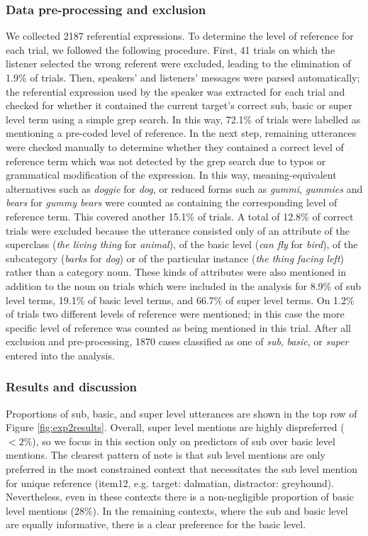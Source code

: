\documentclass[11pt]{article}
\newcommand{\figref}[1]{Figure \ref{#1}}
\begin{document}
\subsubsection{Data pre-processing and exclusion}

We collected 2187 referential expressions. To determine the level of reference for each trial, we followed the following procedure. First, 41 trials on which the listener selected the wrong referent were excluded, leading to the elimination of 1.9\% of trials. Then, speakers' and listeners' messages were parsed automatically; the referential expression used by the speaker was extracted for each trial and checked for whether it contained the current target's correct sub, basic or super level term using a simple grep search. In this way, 72.1\% of trials were labelled as mentioning a pre-coded level of reference. In the next step, remaining utterances were checked manually to determine whether they contained a correct level of reference term which was not detected by the grep search due to typos or grammatical modification of the expression. In this way, meaning-equivalent alternatives such as \emph{doggie} for \emph{dog}, or reduced forms such as \emph{gummi}, \emph{gummies} and \emph{bears} for \emph{gummy bears} were counted as containing the corresponding level of reference term. This covered another 15.1\% of trials. A total of 12.8\% of correct trials were excluded because the utterance consisted only of an attribute of the superclass (\emph{the living thing} for \emph{animal}), of the basic level (\emph{can fly} for \emph{bird}), of the subcategory (\emph{barks} for \emph{dog}) or of the particular instance (\emph{the thing facing left}) rather than a category noun. These kinds of attributes were also mentioned in addition to the noun on trials which were included in the analysis for 8.9\% of sub level terms, 19.1\% of basic level terms, and 66.7\% of super level terms. On 1.2\% of trials two different levels of reference were mentioned; in this case the more specific level of reference was counted as being mentioned in this trial. After all exclusion and pre-processing, 1870 cases classified as one of \emph{sub}, \emph{basic}, or \emph{super} entered into the analysis.



\subsubsection{Results and discussion}

Proportions of sub, basic, and super level utterances are shown in the top row of \figref{fig:exp2results}. Overall, super level mentions are highly dispreferred ($< 2\%$), so we focus in this section only on predictors of sub over basic level mentions. The clearest pattern of note is that sub level mentions are only preferred in the most constrained context that necessitates the sub level mention for unique reference (item12, e.g. target: dalmatian, distractor: greyhound). Nevertheless, even in these contexts there is a non-negligible proportion of basic level mentions (28\%). In the remaining contexts, where the sub and basic level are equally informative, there is a clear preference for the basic level. 
\end{document}
